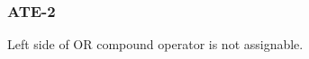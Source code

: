 \subsubsection{ATE-2}\label{sec:error_code_ate_2}

Left side of OR compound operator is not assignable.


